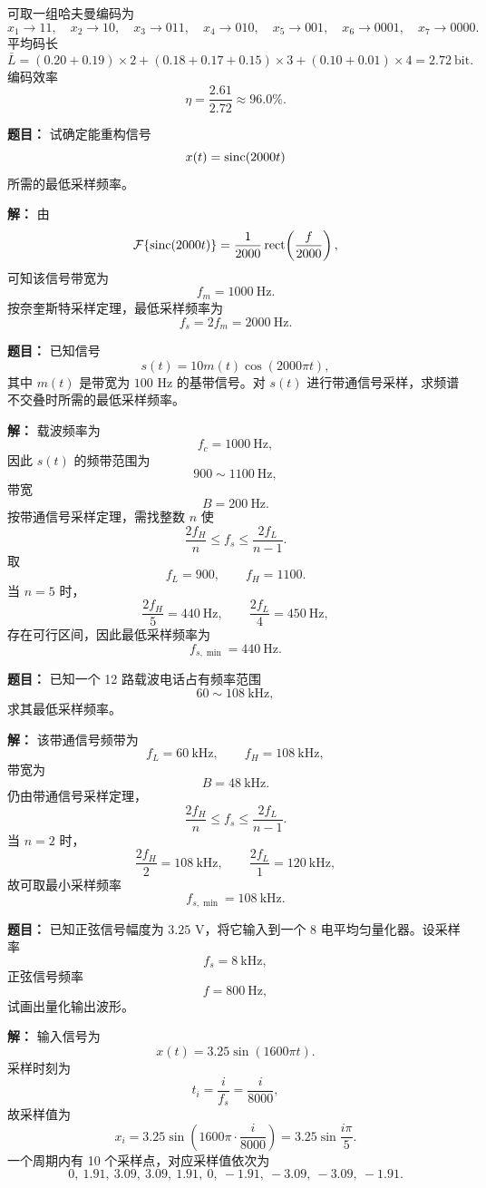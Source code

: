 可取一组哈夫曼编码为
\[
x_1\to 11,\quad
x_2\to 10,\quad
x_3\to 011,\quad
x_4\to 010,\quad
x_5\to 001,\quad
x_6\to 0001,\quad
x_7\to 0000.
\]
平均码长
\[
\bar L=(0.20+0.19)\times 2+(0.18+0.17+0.15)\times 3+(0.10+0.01)\times 4=2.72\ \text{bit}.
\]
编码效率
\[
\eta=\frac{2.61}{2.72}\approx 96.0\%.
\]

\medskip
{}
\textbf{题目：}
试确定能重构信号
\[
x(t)=\operatorname{sinc}(2000t)
\]
所需的最低采样频率。

\par\textbf{解：}
由
\[
\mathcal{F}\{\operatorname{sinc}(2000t)\}=\frac{1}{2000}\operatorname{rect}\!\left(\frac{f}{2000}\right),
\]
可知该信号带宽为
\[
f_m=1000\ \text{Hz}.
\]
按奈奎斯特采样定理，最低采样频率为
\[
f_s=2f_m=2000\ \text{Hz}.
\]

\medskip
{}
\textbf{题目：}
已知信号
\[
s(t)=10m(t)\cos(2000\pi t),
\]
其中 $m(t)$ 是带宽为 $100$ Hz 的基带信号。对 $s(t)$ 进行带通信号采样，求频谱不交叠时所需的最低采样频率。

\par\textbf{解：}
载波频率为
\[
f_c=1000\ \text{Hz},
\]
因此 $s(t)$ 的频带范围为
\[
900\sim1100\ \text{Hz},
\]
带宽
\[
B=200\ \text{Hz}.
\]
按带通信号采样定理，需找整数 $n$ 使
\[
\frac{2f_H}{n}\le f_s\le \frac{2f_L}{n-1}.
\]
取
\[
f_L=900,\qquad f_H=1100.
\]
当 $n=5$ 时，
\[
\frac{2f_H}{5}=440\ \text{Hz},\qquad \frac{2f_L}{4}=450\ \text{Hz},
\]
存在可行区间，因此最低采样频率为
\[
f_{s,\min}=440\ \text{Hz}.
\]

\medskip
{}
\textbf{题目：}
已知一个 12 路载波电话占有频率范围
\[
60\sim108\ \text{kHz},
\]
求其最低采样频率。

\par\textbf{解：}
该带通信号频带为
\[
f_L=60\ \text{kHz},\qquad f_H=108\ \text{kHz},
\]
带宽为
\[
B=48\ \text{kHz}.
\]
仍由带通信号采样定理，
\[
\frac{2f_H}{n}\le f_s\le \frac{2f_L}{n-1}.
\]
当 $n=2$ 时，
\[
\frac{2f_H}{2}=108\ \text{kHz},\qquad \frac{2f_L}{1}=120\ \text{kHz},
\]
故可取最小采样频率
\[
f_{s,\min}=108\ \text{kHz}.
\]

\medskip
{}
\textbf{题目：}
已知正弦信号幅度为 $3.25$ V，将它输入到一个 8 电平均匀量化器。设采样率
\[
f_s=8\ \text{kHz},
\]
正弦信号频率
\[
f=800\ \text{Hz},
\]
试画出量化输出波形。

\par\textbf{解：}
输入信号为
\[
x(t)=3.25\sin(1600\pi t).
\]
采样时刻为
\[
t_i=\frac{i}{f_s}=\frac{i}{8000},
\]
故采样值为
\[
x_i=3.25\sin\!\left(1600\pi\cdot \frac{i}{8000}\right)=3.25\sin\frac{i\pi}{5}.
\]
一个周期内有 10 个采样点，对应采样值依次为
\[
0,\ 1.91,\ 3.09,\ 3.09,\ 1.91,\ 0,\ -1.91,\ -3.09,\ -3.09,\ -1.91.
\]

